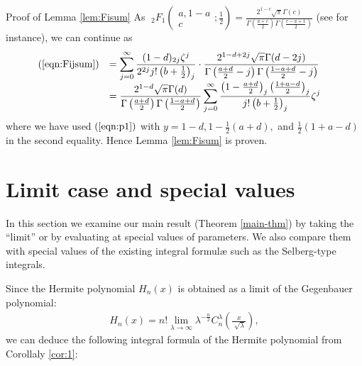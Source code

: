 \documentclass[12pt]{article}
\numberwithin{equation}{section}
\newenvironment{proof*}[1]{\noindent\textbf{#1\ }}{\hspace*{\fill}$\Box$\medskip}
\begin{document}
\begin{proof*}{Proof of Lemma \ref{lem:Fisum}}
  As $\;_2 F_1 \left( \begin{array}{c}
    a, 1 - a\\
    c
  \end{array} ; \displaystyle\frac{1}{2} \right) =\displaystyle \frac{2^{1 - c} \sqrt{\pi} \Gamma
  (c)}{\Gamma \left( \frac{a + c}{2} \right) \Gamma \left( \frac{c - a + 1}{2}
  \right)}$ (see {\cite[Thm. 5.4]{andrews2000special}} for instance), we can
  continue as
  \begin{eqnarray}
    & \begin{array}{ll}
      (\ref{eqn:Fijsum}) & = \displaystyle\sum_{j = 0}^{\infty} \frac{(1 - d)_{2 j}
      \zeta^j}{2^{2 j} j! \left( b + \frac{1}{2} \right)_j} \cdot \frac{2^{1 -
      d + 2 j} \sqrt{\pi} \Gamma (d - 2 j)}{\Gamma \left( \frac{a + d}{2} - j
      \right) \Gamma \left( \frac{1 - a + d}{2} - j \right)}\\
      &\displaystyle = \frac{2^{1 - d} \sqrt{\pi} \Gamma (d)}{\Gamma \left( \frac{a +
      d}{2} \right) \Gamma \left( \frac{1 - a + d}{2} \right)} \displaystyle\sum_{j =
      0}^{\infty} \frac{\left( 1 - \frac{a + d}{2} \right)_j \left( \frac{1 +
      a - d}{2} \right)_j}{j! \left( b + \frac{1}{2} \right)_j} \zeta^j
    \end{array} &  \nonumber
  \end{eqnarray}
  where we have used $(\ref{eqn:p1})$ with $y = 1 - d, 1 - \frac{1}{2} (a +
  d),$ and $\frac{1}{2} (1 + a - d)$ in the second equality. Hence Lemma
  \ref{lem:Fisum} is proven.
\end{proof*}

\section{Limit case and special values}\label{sec:4}

In this section we examine our main result (Theorem \ref{main-thm}) by taking
the ``limit'' or by evaluating at special values of parameters. We also
compare them with special values of the existing integral formul{\ae} such as
the Selberg-type integrals.

Since the Hermite polynomial $H_n (x)$ is obtained as a limit of the
Gegenbauer polynomial:
\begin{eqnarray}
  & H_n (x) = n! \lim_{\lambda \rightarrow \infty} \lambda^{- \frac{n}{2}}
  C_n^{\lambda} \left( \displaystyle\frac{x}{\sqrt[]{\lambda}} \right), &  \nonumber
\end{eqnarray}
we can deduce the following integral formula of the Hermite polynomial from
Corollaly \ref{cor:1}:
\end{document}
